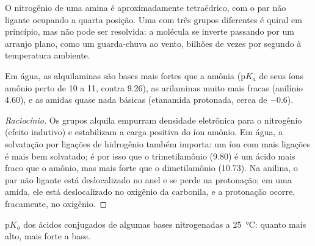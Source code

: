 O nitrogênio de uma amina é aproximadamente tetraédrico, com o par não ligante
ocupando a quarta posição. Uma  com três grupos diferentes é
quiral em princípio, mas não pode ser resolvida: a molécula se inverte
passando por um arranjo plano, como um guarda-chuva ao vento, bilhões de vezes
por segundo à temperatura ambiente.

\begin{proposition}[Basicidade]\label{prop:b2:amines:basicity}
Em água, as alquilaminas são bases mais fortes que a amônia ($\mathrm pK_a$ de
seus íons amônio perto de 10 a 11, contra 9.26), as arilaminas muito mais
fracas (anilínio 4.60), e as amidas quase nada básicas (etanamida protonada,
cerca de $-0.6$).
\end{proposition}

\begin{proof}[Raciocínio]
Os grupos alquila empurram densidade eletrônica para o nitrogênio (efeito
indutivo) e estabilizam a carga positiva do íon amônio. Em água, a solvatação
por ligações de hidrogênio também importa: um íon com mais ligações  é
mais bem solvatado; é por isso que o trimetilamônio (9.80) é um ácido mais
fraco que o amônio, mas mais forte que o dimetilamônio (10.73). Na anilina, o
par não ligante está deslocalizado no anel e se perde na protonação; em uma
amida, ele está deslocalizado no oxigênio da carbonila, e a protonação ocorre,
fracamente, no oxigênio.
\end{proof}

\begin{omfigure}

{\small $\mathrm pK_a$ dos ácidos conjugados de algumas bases nitrogenadas a
\qty{25}{\degreeCelsius}: quanto mais alto, mais forte a base.}
\end{omfigure}


